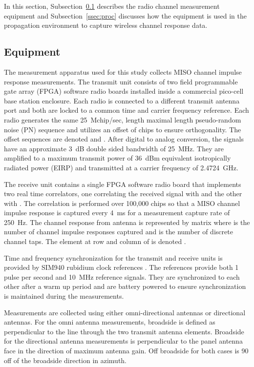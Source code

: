 \documentclass[12pt]{IEEEtran}
\begin{document}
In this section, Subsection~\ref{ssec:equip} describes the radio channel measurement equipment and Subsection~\ref{ssec:proc} discusses how the equipment is used in the propagation environment to capture wireless channel response data.


\subsection{Equipment}
\label{ssec:equip}

The measurement apparatus used for this study collects  MISO channel impulse response measurements.  The transmit unit consists of two field programmable gate array (FPGA) software radio boards installed inside a commercial pico-cell base station enclosure. Each radio is connected to a different transmit antenna port and both are locked to a common time and carrier frequency reference.  Each radio generates the same 25~Mchip/sec, length  maximal length pseudo-random noise (PN) sequence \cite{proakis_jg1} and utilizes an offset of  chips to ensure orthogonality. The offset sequences are denoted  and .  After digital to analog conversion, the signals have an approximate 3~dB double sided bandwidth of 25~MHz.  They are amplified to a maximum transmit power of 36~dBm equivalent isotropically radiated power (EIRP) and transmitted at a carrier frequency of 2.4724~GHz.

The receive unit contains a single FPGA software radio board that implements two real time correlators, one correlating the received signal with  and the other with .  The correlation is performed over 100,000 chips so that a  MISO channel impulse response is captured every 4~ms for a measurement capture rate of 250~Hz.  The channel response from antenna  is represented by matrix  where  is the number of channel impulse responses captured and  is the number of discrete channel taps.  The element at row  and column  of  is denoted .

Time and frequency synchronization for the transmit and receive units is provided by SIM940 rubidium clock references \cite{sim940}.  The references provide both 1 pulse per second and 10~MHz reference signals.  They are synchronized to each other after a warm up period and are battery powered to ensure synchronization is maintained during the measurements.

Measurements are collected using either omni-directional antennas or directional antennas. For the omni antenna measurements, broadside is defined as perpendicular to the line through the two transmit antenna elements.  Broadside for the directional antenna measurements is perpendicular to the panel antenna face in the direction of maximum antenna gain.  Off broadside for both cases is 90 off of the broadside direction in azimuth.
\end{document}
